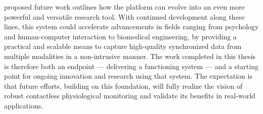 proposed future work outlines how the platform can evolve into an even more powerful and versatile research tool. With continued development along these lines, this system could accelerate advancements in fields ranging from psychology and human-computer interaction to biomedical engineering, by providing a practical and scalable means to capture high-quality synchronized data from multiple modalities in a non-intrusive manner. The work completed in this thesis is therefore both an endpoint --- delivering a functioning system --- and a starting point for ongoing innovation and research using that system. The expectation is that future efforts, building on this foundation, will fully realize the vision of robust contactless physiological monitoring and validate its benefits in real-world applications. 